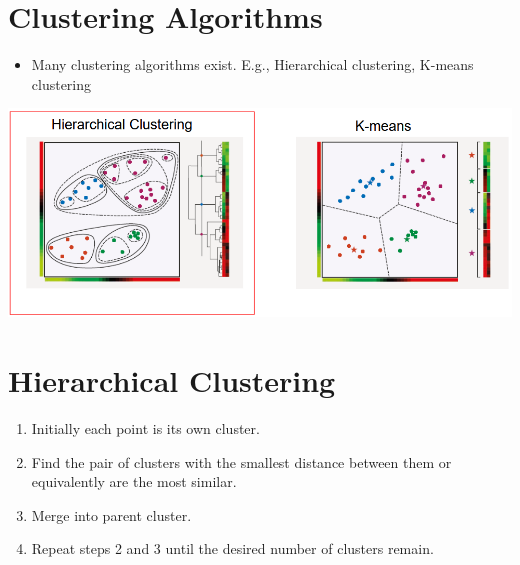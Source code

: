 \documentclass[10pt]{article}
\begin{document}
\section*{Clustering Algorithms}
\begin{itemize}
    \item Many clustering algorithms exist.  E.g., Hierarchical clustering, K-means clustering
\end{itemize}
\begin{center}
    \includegraphics[width=\textwidth]{W6_6.png}
\end{center}

\section*{Hierarchical Clustering}
\begin{enumerate}
    \item Initially each point is its own cluster.
    \item Find the pair of clusters with the smallest distance between them or equivalently are the most similar.
    \item Merge into parent cluster.
    \item Repeat steps 2 and 3 until the desired number of clusters remain.
\end{enumerate}
\end{document}
